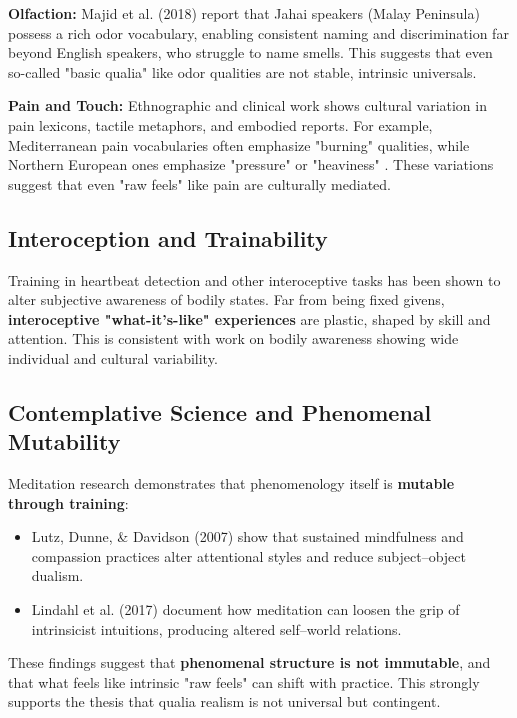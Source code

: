 \documentclass[11pt,a4paper]{article}
\begin{document}
\textbf{Olfaction:} Majid et al. (2018) report that Jahai speakers (Malay Peninsula) possess a rich odor vocabulary, enabling consistent naming and discrimination far beyond English speakers, who struggle to name smells. This suggests that even so-called "basic qualia" like odor qualities are not stable, intrinsic universals.

\textbf{Pain and Touch:} Ethnographic and clinical work shows cultural variation in pain lexicons, tactile metaphors, and embodied reports. For example, Mediterranean pain vocabularies often emphasize "burning" qualities, while Northern European ones emphasize "pressure" or "heaviness" \cite{hardin1997}. These variations suggest that even "raw feels" like pain are culturally mediated.

\subsection{Interoception and Trainability}

Training in heartbeat detection and other interoceptive tasks has been shown to alter subjective awareness of bodily states. Far from being fixed givens, \textbf{interoceptive "what-it's-like" experiences} are plastic, shaped by skill and attention. This is consistent with work on bodily awareness showing wide individual and cultural variability.

\subsection{Contemplative Science and Phenomenal Mutability}

Meditation research demonstrates that phenomenology itself is \textbf{mutable through training}:

\begin{itemize}
\item Lutz, Dunne, \& Davidson (2007) show that sustained mindfulness and compassion practices alter attentional styles and reduce subject–object dualism.
\item Lindahl et al. (2017) document how meditation can loosen the grip of intrinsicist intuitions, producing altered self–world relations.
\end{itemize}

These findings suggest that \textbf{phenomenal structure is not immutable}, and that what feels like intrinsic "raw feels" can shift with practice. This strongly supports the thesis that qualia realism is not universal but contingent.
\end{document}
